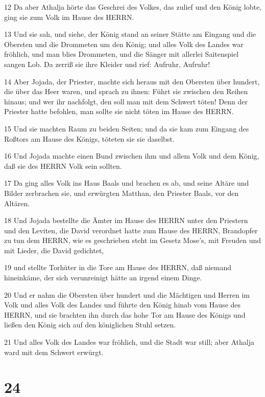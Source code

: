 \par 12 Da aber Athalja hörte das Geschrei des Volkes, das zulief und den König lobte, ging sie zum Volk im Hause des HERRN.
\par 13 Und sie sah, und siehe, der König stand an seiner Stätte am Eingang und die Obersten und die Drommeten um den König; und alles Volk des Landes war fröhlich, und man blies Drommeten, und die Sänger mit allerlei Saitenspiel sangen Lob. Da zerriß sie ihre Kleider und rief: Aufruhr, Aufruhr!
\par 14 Aber Jojada, der Priester, machte sich heraus mit den Obersten über hundert, die über das Heer waren, und sprach zu ihnen: Führt sie zwischen den Reihen hinaus; und wer ihr nachfolgt, den soll man mit dem Schwert töten! Denn der Priester hatte befohlen, man sollte sie nicht töten im Hause des HERRN.
\par 15 Und sie machten Raum zu beiden Seiten; und da sie kam zum Eingang des Roßtors am Hause des Königs, töteten sie sie daselbst.
\par 16 Und Jojada machte einen Bund zwischen ihm und allem Volk und dem König, daß sie des HERRN Volk sein sollten.
\par 17 Da ging alles Volk ins Haus Baals und brachen es ab, und seine Altäre und Bilder zerbrachen sie, und erwürgten Matthan, den Priester Baals, vor den Altären.
\par 18 Und Jojada bestellte die Ämter im Hause des HERRN unter den Priestern und den Leviten, die David verordnet hatte zum Hause des HERRN, Brandopfer zu tun dem HERRN, wie es geschrieben steht im Gesetz Mose's, mit Freuden und mit Lieder, die David gedichtet,
\par 19 und stellte Torhüter in die Tore am Hause des HERRN, daß niemand hineinkäme, der sich verunreinigt hätte an irgend einem Dinge.
\par 20 Und er nahm die Obersten über hundert und die Mächtigen und Herren im Volk und alles Volk des Landes und führte den König hinab vom Hause des HERRN, und sie brachten ihn durch das hohe Tor am Hause des Königs und ließen den König sich auf den königlichen Stuhl setzen.
\par 21 Und alles Volk des Landes war fröhlich, und die Stadt war still; aber Athalja ward mit dem Schwert erwürgt.

\chapter{24}

